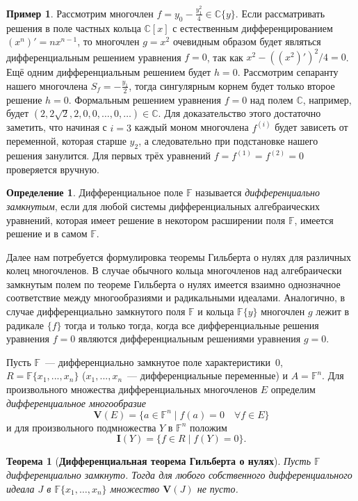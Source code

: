 \documentclass[16pt]{article}
\theoremstyle{plain1}
\theoremstyle{plain2}
\theoremstyle{plain}
\newtheorem{theorem}{Теорема}
\theoremstyle{plain3}
\theoremstyle{definition}
\newtheorem{definition}[theorem2]{Определение}
\newtheorem*{example*}{Пример}
\theoremstyle{remark}
\begin{document}
\begin{example*}
Рассмотрим многочлен $f=y_0-\frac{y^2_1}{4}\in\mathbb{C}\{y\}$. Если рассматривать решения в поле частных кольца $\mathbb{C}[x]$ с естественным дифференцированием $(x^n)'=nx^{n-1}$, то многочлен $g=x^2$ очевидным образом будет являться  дифференциальным решением уравнения $f=0$, так как $x^2-((x^2)')^2/4=0$. Ещё одним дифференциальным решением будет $h=0$. Рассмотрим сепаранту нашего многочлена $S_f=-\frac{y_1}{2}$, тогда сингулярным корнем будет только второе решение $h=0$. Формальным решением уравнения $f=0$ над полем $\mathbb{C}$, например, будет $(2,2\sqrt{2},2,0,0,\ldots,0,\ldots)\in \mathbb{C}$. Для доказательство этого достаточно заметить, что начиная с $i=3$ каждый моном  многочлена $f^{(i)}$ будет зависеть от переменной, которая старше $y_2$, а следовательно при подстановке нашего решения занулится. Для первых трёх уравнений $f=f^{(1)}=f^{(2)}=0$ проверяется вручную.
\end{example*}

\begin{definition} Дифференциальное поле $\mathbb{F}$ называется
\emph{дифференциально замкнутым}, если для любой системы дифференциальных алгебраических
уравнений, которая имеет решение в некотором расширении поля $\mathbb{F}$,
имеется решение и в самом $\mathbb{F}$.
\end{definition}

Далее нам потребуется формулировка теоремы Гильберта о нулях для
различных колец многочленов.
В случае обычного кольца многочленов над алгебраически
замкнутым полем по теореме Гильберта о нулях
имеется взаимно однозначное соответствие между многообразиями и радикальными идеалами.
Аналогично, в случае дифференциально
замкнутого поля $\mathbb{F}$ и кольца $\mathbb{F}\{y\}$ многочлен $g$ лежит в
радикале $\{f\}$ тогда и только тогда, когда все дифференциальные
решения уравнения $f=0$ являются дифференциальным решениями уравнения $g=0$.

Пусть $\mathbb{F}$~--- дифференциально замкнутое поле характеристики~$0$,
$R=\mathbb{F}\{x_1,...,x_n\}$ ($x_1,...,x_n$~--- дифференциальные
переменные) и $A=\mathbb{F}^n$. Для произвольного множества
дифференциальных многочленов $E$ определим \emph{дифференциальное многообразие}
$$
\mathbf{V}(E)=\{a\in \mathbb{F}^n \mid f(a)=0\quad\forall  f\in E\}
$$
и для произвольного подмножества $Y$ в $\mathbb{F}^n$ положим
$$
\mathbf{I}(Y)=\{f \in R \mid f(Y)=0\}.
$$

\begin{theorem}[\bf Дифференциальная теорема Гильберта о нулях]\label{theorem:th 0 for dif}
Пусть $\mathbb{F}$ дифференциально замкнуто. Тогда для любого собственного дифференциального идеала $J$ в
$\mathbb{F}\{x_1,\ldots,x_n\}$ множество $\mathbf{V}(J)$ не пусто. \cite[Chapter~IV,
Section~2, Theorem~1]{Kolchin 2}
\end{theorem}
\end{document}
